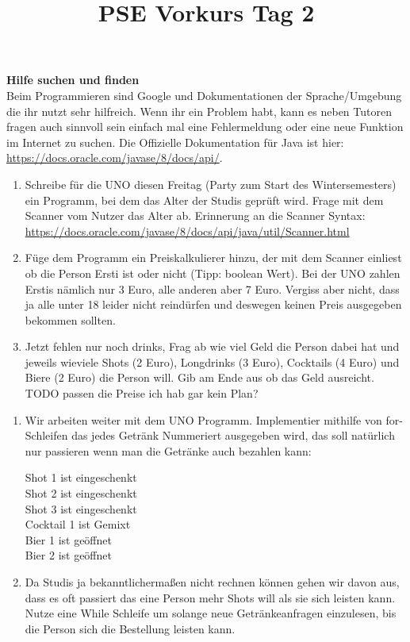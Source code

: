 \documentclass{../../sheet}
\title{PSE Vorkurs Tag 2}
\begin{document}
\maketitle

\textbf{Hilfe suchen und finden}\\
Beim Programmieren sind Google und Dokumentationen der Sprache/Umgebung die ihr nutzt sehr hilfreich. Wenn ihr ein Problem habt, kann es neben Tutoren fragen auch sinnvoll sein einfach mal eine Fehlermeldung oder eine neue Funktion im Internet zu suchen. Die Offizielle Dokumentation für Java ist hier: \url{https://docs.oracle.com/javase/8/docs/api/}. 

\newpage
{}
\begin{enumerate}
    \item Schreibe für die UNO diesen Freitag (Party zum Start des Wintersemesters) ein Programm, bei dem das Alter der Studis geprüft wird. Frage mit dem Scanner vom Nutzer das Alter ab. Erinnerung an die Scanner Syntax:\\ \url{https://docs.oracle.com/javase/8/docs/api/java/util/Scanner.html}
    \item Füge dem Programm ein Preiskalkulierer hinzu, der mit dem Scanner einliest ob die Person Ersti ist oder nicht (Tipp: boolean Wert). Bei der UNO zahlen Erstis nämlich nur 3 Euro, alle anderen aber 7 Euro. Vergiss aber nicht, dass ja alle unter 18 leider nicht reindürfen und deswegen keinen Preis ausgegeben bekommen sollten.
    \item Jetzt fehlen nur noch drinks, Frag ab wie viel Geld die Person dabei hat und jeweils wieviele Shots (2 Euro), Longdrinks (3 Euro), Cocktails (4 Euro) und Biere (2 Euro) die Person will. Gib am Ende aus ob das Geld ausreicht. 
    TODO passen die Preise ich hab gar kein Plan?
\end{enumerate}

\newpage
{}
\begin{enumerate}
    \item Wir arbeiten weiter mit dem UNO Programm. Implementier mithilfe von for-Schleifen das jedes Getränk Nummeriert ausgegeben wird, das soll natürlich nur passieren wenn man die Getränke auch bezahlen kann: 
    \begin{ausgabe}
Shot 1 ist  eingeschenkt\\
Shot 2 ist  eingeschenkt\\
Shot 3 ist  eingeschenkt\\
Cocktail 1 ist  Gemixt\\
Bier 1 ist geöffnet\\
Bier 2 ist geöffnet
    \end{ausgabe}
    \item Da Studis ja bekanntlichermaßen nicht rechnen können gehen wir davon aus, dass es oft passiert das eine Person mehr Shots will als sie sich leisten kann. Nutze eine While Schleife um solange neue Getränkeanfragen einzulesen, bis die Person sich die Bestellung leisten kann. 
\end{enumerate}
\end{document}
